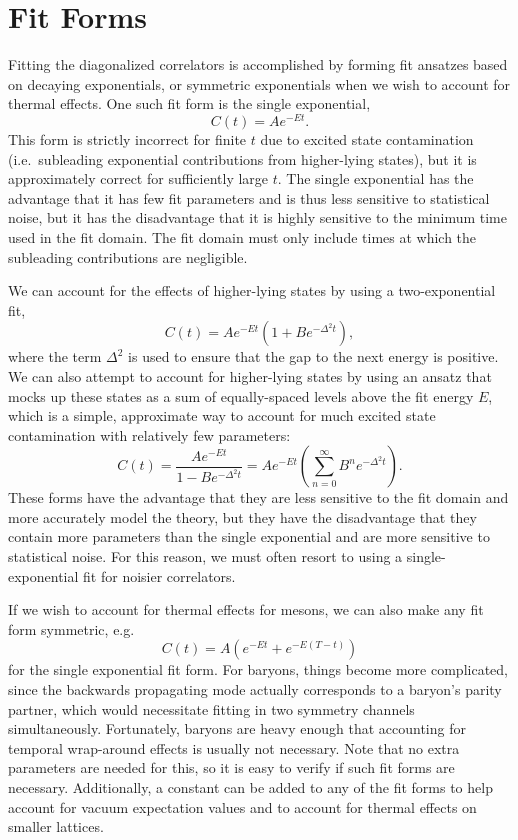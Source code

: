 \section{Fit Forms}\label{sec:fit_forms}
Fitting the diagonalized correlators is accomplished by forming fit ansatzes based on decaying exponentials, or symmetric exponentials when we wish to account for thermal effects. One such fit form is the single exponential,
\begin{equation}\label{eq:single_exp}
    C(t) = Ae^{-E t}.
\end{equation}
This form is strictly incorrect for finite $t$ due to excited state contamination (i.e.\ subleading exponential contributions from higher-lying states), but it is approximately correct for sufficiently large $t$. The single exponential has the advantage that it has few fit parameters and is thus less sensitive to statistical noise, but it has the disadvantage that it is highly sensitive to the minimum time used in the fit domain. The fit domain must only include times at which the subleading contributions are negligible.

We can account for the effects of higher-lying states by using a two-exponential fit,
\begin{equation}
    C(t)=A e^{-E t}\left(1+B e^{-\Delta^{2} t}\right),
\end{equation}
where the term $\Delta^2$ is used to ensure that the gap to the next energy is positive. We can also attempt to account for higher-lying states by using an ansatz that mocks up these states as a sum of equally-spaced levels above the fit energy $E$, which is a simple, approximate way to account for much excited state contamination with relatively few parameters:
\begin{equation}
    C(t)=\frac{A e^{-E t}}{1-B e^{-\Delta^{2} t}} = Ae^{-Et}\left(\sum_{n=0}^\infty B^n e^{-\Delta^{2}t}\right).
\end{equation}
These forms have the advantage that they are less sensitive to the fit domain and more accurately model the theory, but they have the disadvantage that they contain more parameters than the single exponential and are more sensitive to statistical noise. For this reason, we must often resort to using a single-exponential fit for noisier correlators.

If we wish to account for thermal effects for mesons, we can also make any fit form symmetric, e.g.\
\begin{equation}
    C(t)=A\left(e^{-E t}+e^{-E(T-t)}\right)
\end{equation}
for the single exponential fit form. For baryons, things become more complicated, since the backwards propagating mode actually corresponds to a baryon's parity partner, which would necessitate fitting in two symmetry channels simultaneously. Fortunately, baryons are heavy enough that accounting for temporal wrap-around effects is usually not necessary. Note that no extra parameters are needed for this, so it is easy to verify if such fit forms are necessary. Additionally, a constant can be added to any of the fit forms to help account for vacuum expectation values and to account for thermal effects on smaller lattices.
